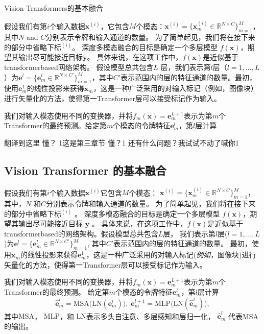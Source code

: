 Vision Transformers的基本融合

假设我们有第$i$个输入数据$\bm{x}^{(i)}$，它包含$M$个模态：$\bm{x}^{(i)}=\{\bm{x}_m^{(i)}\in\mathbb{R}^{N\times C}\}_{m=1}^M$，其中$N$ and $C$分别表示令牌和输入通道的数量。
为了简单起见，我们将在接下来的部分中省略下标$^{(i)}$。
深度多模态融合的目标是确定一个多层模型 $f(\bm{x})$，期望其输出尽可能接近目标$\bm{y}$。
具体来说，在这项工作中，$f(\bm{x})$是近似基于transformerbased网络架构。
假设模型总共包含$L$ 层，我们表示第$l$层（$l=1,\ldots,L$）为$\bm{e}^l=\{\bm{e}^l_m\in\mathbb{R}^{N\times C'}\}_{m=1}^M$，其中$C'$表示范围内的层的特征通道的数量。最初，使用$\bm{e}_m^1$的线性投影来获得$\bm{x}_m$，这是一种广泛采用的对输入标记（例如，图像块）进行矢量化的方法，使得第一Transformer层可以接受标记作为输入。





我们对输入模态使用不同的变换器，并将$f_m(\bm{x})=\bm{e}_m^{L+1}$表示为第$m$个Transformer的最终预测。给定第$m$个模态的令牌特征$\bm{e}_m^{l}$，第$l$层计算





翻译到这里 懂？
1这是第三章节 懂？1
还有什么问题？我试试不动了喊你1
\subsection{Vision Transformer 的基本融合}
\label{subsec:intuitive_fusion}
假设我们有第$i$个输入数据$\bm{x}^{(i)}$它包含$M$个模态： $\bm{x}^{(i)}=\{\bm{x}_m^{(i)}\in\mathbb{R}^{N\times C}\}_{m=1}^M$，其中，$N$ 和$C$分别表示令牌和输入通道的数量。 
为了简单起见，我们将在接下来的部分中省略下标$^{(i)}$ 。
深度多模态融合的目标是确定一个多层模型 $f(\bm{x})$，期望其输出尽可能接近目标 $\bm{y}$ 。 
具体来说，在这项工作中，$f(\bm{x})$是近似基于transformerbased的网络架构。假设模型总共包含$L$层， 我们表示第$l$层($l=1,\ldots,L$)为$\bm{e}^l=\{\bm{e}^l_m\in\mathbb{R}^{N\times C'}\}_{m=1}^M$, 其中$C'$表示范围内的层的特征通道的数量。
最初，使用$\bm{x}_m$的线性投影来获得$\bm{e}_m^1$，这是一种广泛采用的对输入标记(\emph{例如}，图像块)进行矢量化的方法，使得第一Transformer层可以接受标记作为输入。

我们对输入模态使用不同的变换器，并将$f_m(\bm{x})=\bm{e}_m^{L+1}$表示为第$m$个Transformer的最终预测。
给定第$m$个模态的令牌特征$\bm{e}_m^{l}$，第$l$层计算
\begin{equation}
	\label{eq:token-feature}
	\hat{\bm{e}}_m^l=\text{MSA}\big(\text{LN}(\bm{e}_m^{l})\big),\; \bm{e}_m^{l+1}=\text{MLP}\big(\text{LN}(\hat{\bm{e}}_m^l)\big),
\end{equation}
其中$\text{MSA}$， $\text{MLP}$，和 $\text{LN}$表示多头自注意、多层感知和层归一化，
$\hat{\bm{e}}^l_m$ 代表MSA的输出。 

